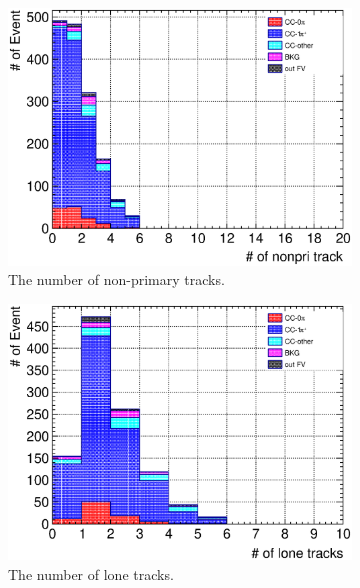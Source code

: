 \begin{figure}
\begin{subfigure}{\dbfigwid\textwidth}
       \includegraphics[width=\textwidth]{figures/sel/SFGmu_nnonpritrk_stack_al9.eps}
       \caption{The number of non-primary tracks.}
       \label{subfig:tlpi-trknum-nonpri-sfgmu-cut}
  \end{subfigure}
  \begin{subfigure}{\dbfigwid\textwidth}
       \includegraphics[width=\textwidth]{figures/sel/SFGmu_nlon_stack_al9.eps}
       \caption{The number of lone tracks.}
       \label{subfig:tlpi-trknum-lone-sfgmu-cut}
  \end{subfigure}
  \\
  \begin{subfigure}{\dbfigwid\textwidth}

\end{subfigure}
\end{figure}
